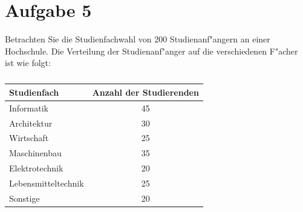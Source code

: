 \section{Aufgabe 5}
\setcounter{section}{5}

Betrachten Sie die Studienfachwahl von 200 Studienanf"angern an einer
Hochschule. Die Verteilung der Studienanf"anger auf die verschiedenen F"acher
ist wie folgt:

\begin{table}[h]
    \centering
    \begin{tabular}{l|c}
        \multicolumn{1}{l}{Studienfach} & \multicolumn{1}{c}{Anzahl der Studierenden} \\ \hline
        Informatik & 45 \\
        Architektur & 30 \\
        Wirtschaft & 25 \\
        Maschinenbau & 35 \\
        Elektrotechnik & 20 \\
        Lebensmitteltechnik & 25 \\
        Sonstige & 20
    \end{tabular}
    \caption{}
\end{table}

